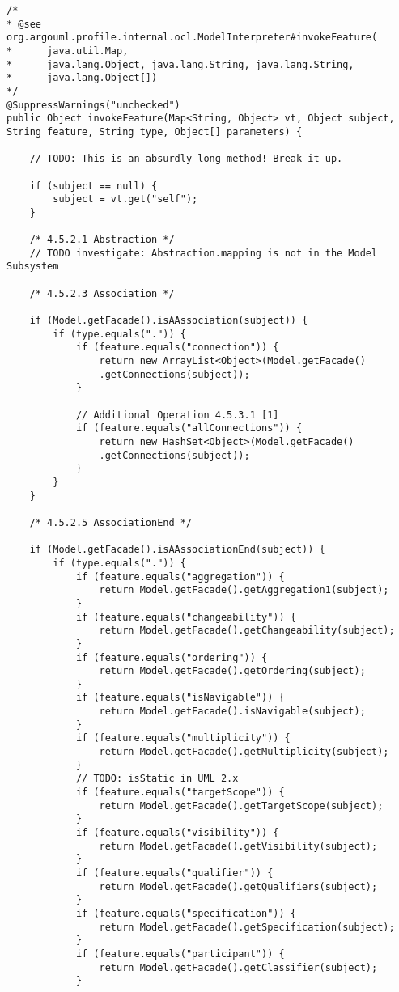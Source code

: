 \begin{mdframed}
\begin{lstlisting}
/*
* @see org.argouml.profile.internal.ocl.ModelInterpreter#invokeFeature(
*	   java.util.Map,
*      java.lang.Object, java.lang.String, java.lang.String,
*      java.lang.Object[])
*/
@SuppressWarnings("unchecked")
public Object invokeFeature(Map<String, Object> vt, Object subject,
String feature, String type, Object[] parameters) {
	
	// TODO: This is an absurdly long method! Break it up.
	
	if (subject == null) {
		subject = vt.get("self");
	}
	
	/* 4.5.2.1 Abstraction */  
	// TODO investigate: Abstraction.mapping is not in the Model Subsystem
	
	/* 4.5.2.3 Association */  
	
	if (Model.getFacade().isAAssociation(subject)) {
		if (type.equals(".")) {
			if (feature.equals("connection")) {
				return new ArrayList<Object>(Model.getFacade()
				.getConnections(subject));
			}
			
			// Additional Operation 4.5.3.1 [1]
			if (feature.equals("allConnections")) {
				return new HashSet<Object>(Model.getFacade()
				.getConnections(subject));
			}                              
		}                       
	}
	
	/* 4.5.2.5 AssociationEnd */  
	
	if (Model.getFacade().isAAssociationEnd(subject)) {
		if (type.equals(".")) {
			if (feature.equals("aggregation")) {
				return Model.getFacade().getAggregation1(subject);
			}
			if (feature.equals("changeability")) {
				return Model.getFacade().getChangeability(subject);
			}
			if (feature.equals("ordering")) {
				return Model.getFacade().getOrdering(subject);
			}
			if (feature.equals("isNavigable")) {
				return Model.getFacade().isNavigable(subject);
			}
			if (feature.equals("multiplicity")) {
				return Model.getFacade().getMultiplicity(subject);
			}
			// TODO: isStatic in UML 2.x
			if (feature.equals("targetScope")) {
				return Model.getFacade().getTargetScope(subject);
			}
			if (feature.equals("visibility")) {
				return Model.getFacade().getVisibility(subject);
			}
			if (feature.equals("qualifier")) {
				return Model.getFacade().getQualifiers(subject);
			}
			if (feature.equals("specification")) {
				return Model.getFacade().getSpecification(subject);
			}                
			if (feature.equals("participant")) {
				return Model.getFacade().getClassifier(subject);
			}
			

\end{lstlisting}
\end{mdframed}
